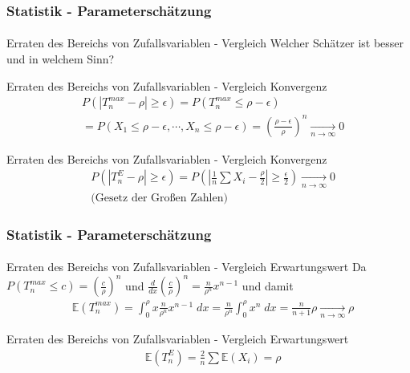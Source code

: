 \documentclass{beamer}
\begin{document}
\begin{frame}
    \frametitle{Statistik - Parameterschätzung}
\framesubtitle{}

\begin{block}{Erraten des Bereichs von Zufallsvariablen - Vergleich}
Welcher Schätzer ist besser und in welchem Sinn?
\end{block}

\begin{block}{Erraten des Bereichs von Zufallsvariablen - Vergleich Konvergenz}
\begin{align*}
& P(| T_n^{max} - \rho | \geq \epsilon)   = P(T_n^{max} \leq \rho - \epsilon)   \\
& = P(X_1  \leq \rho - \epsilon, \cdots,  X_n \leq \rho - \epsilon )  = (\frac{\rho - \epsilon}{\rho})^n \underset{n \to \infty}{\longrightarrow} 0
\end{align*}
\end{block}


\begin{block}{Erraten des Bereichs von Zufallsvariablen - Vergleich Konvergenz}
\begin{align*}
& P(| T_n^{E} - \rho | \geq \epsilon)   = P(| \frac{1}{n} \sum X_i  - \frac{\rho}{2} | \geq \frac{\epsilon}{2})  \underset{n \to \infty}{\longrightarrow} 0 \\
 & \text{(Gesetz der Großen Zahlen)}
\end{align*}
\end{block}

 \end{frame}


\begin{frame}
    \frametitle{Statistik - Parameterschätzung}
\framesubtitle{}


\begin{block}{Erraten des Bereichs von Zufallsvariablen - Vergleich Erwartungswert}
Da $P( T_n^{max}  \leq c) = (\frac{c}{\rho})^n $ und  $\frac{d}{dx} (\frac{c}{\rho})^n = \frac{n}{\rho^n} x^{n-1} $ und damit
\begin{align*}
& \mathbb{E}(T_n^{max} ) = \int_{0}^{\rho} x \frac{n}{\rho^n} x^{n- 1} \; dx  = \frac{n}{\rho^n} \int_{0}^{\rho} x^n \; dx = \frac{n}{n+1} \rho    \underset{n \to \infty}{\longrightarrow} \rho
\end{align*}
\end{block}

\begin{block}{Erraten des Bereichs von Zufallsvariablen - Vergleich Erwartungswert}
\begin{align*}
& \mathbb{E}(T_n^{E} ) = \frac{2}{n} \sum \mathbb{E}(X_i)   = \rho
\end{align*}
\end{block}
 \end{frame}
\end{document}
